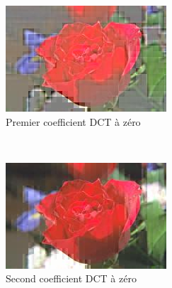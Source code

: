 \begin{figure}[H]
    \centering
    \begin{subfigure}[b]{0.3\textwidth}
        \includegraphics[width=\textwidth]{img/tot0.jpg}
        \caption{Premier coefficient DCT à zéro}
        \label{img:5}
    \end{subfigure}
    ~ %
    \begin{subfigure}[b]{0.3\textwidth}
        \includegraphics[width=\textwidth]{img/tot1.jpg}
        \caption{Second coefficient DCT à zéro}
        \label{img:3}
    \end{subfigure}
    ~ %
    \begin{subfigure}[b]{0.3\textwidth}

\end{subfigure}
\end{figure}
